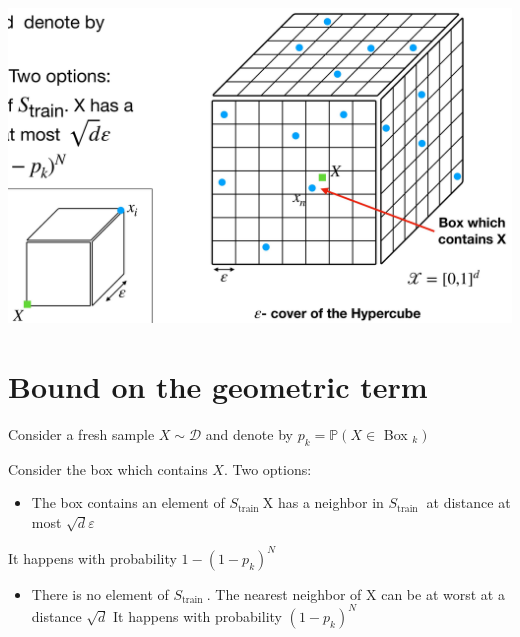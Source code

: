 \documentclass[10pt]{article}
\begin{document}
\begin{center}
\includegraphics[max width=\textwidth]{2023_12_30_f937b0007b5d87b39f79g-36}
\end{center}

\section*{Bound on the geometric term}
Consider a fresh sample $X \sim \mathscr{D}$ and denote by $p_{k}=\mathbb{P}\left(X \in\right.$ Box $\left._{k}\right)$

Consider the box which contains $X$. Two options:

\begin{itemize}
  \item The box contains an element of $S_{\text {train }} \mathrm{X}$ has a neighbor in $S_{\text {train }}$ at distance at most $\sqrt{d} \varepsilon$
\end{itemize}

It happens with probability $1-\left(1-p_{k}\right)^{N}$

\begin{itemize}
  \item There is no element of $S_{\text {train }}$. The nearest neighbor of $\mathrm{X}$ can be at worst at a distance $\sqrt{d}$ It happens with probability $\left(1-p_{k}\right)^{N}$
\end{itemize}
\end{document}
